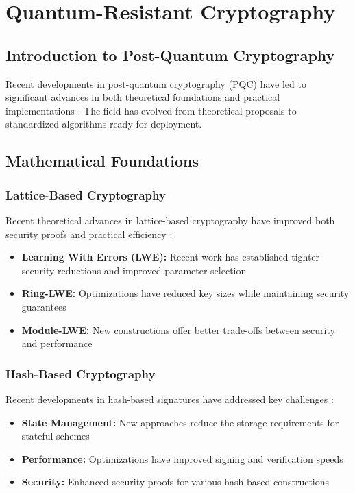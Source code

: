 \chapter{Quantum-Resistant Cryptography}\label{chap:quantum_resistant}

\section{Introduction to Post-Quantum Cryptography}

Recent developments in post-quantum cryptography (PQC) have led to significant advances in both theoretical foundations and practical implementations \parencite{pqc_advances_2024}. The field has evolved from theoretical proposals to standardized algorithms ready for deployment.

\section{Mathematical Foundations}

\subsection{Lattice-Based Cryptography}
Recent theoretical advances in lattice-based cryptography have improved both security proofs and practical efficiency \parencite{lattice_theory_2024}:

\begin{itemize}
    \item \textbf{Learning With Errors (LWE):} Recent work has established tighter security reductions and improved parameter selection \parencite{lwe_security_2024}
    \item \textbf{Ring-LWE:} Optimizations have reduced key sizes while maintaining security guarantees \parencite{ring_lwe_optimizations_2024}
    \item \textbf{Module-LWE:} New constructions offer better trade-offs between security and performance \parencite{module_lwe_2024}
\end{itemize}

\subsection{Hash-Based Cryptography}
Recent developments in hash-based signatures have addressed key challenges \parencite{hash_based_advances_2024}:

\begin{itemize}
    \item \textbf{State Management:} New approaches reduce the storage requirements for stateful schemes \parencite{state_management_2024}
    \item \textbf{Performance:} Optimizations have improved signing and verification speeds \parencite{hash_performance_2024}
    \item \textbf{Security:} Enhanced security proofs for various hash-based constructions \parencite{hash_security_2024}
\end{itemize}

